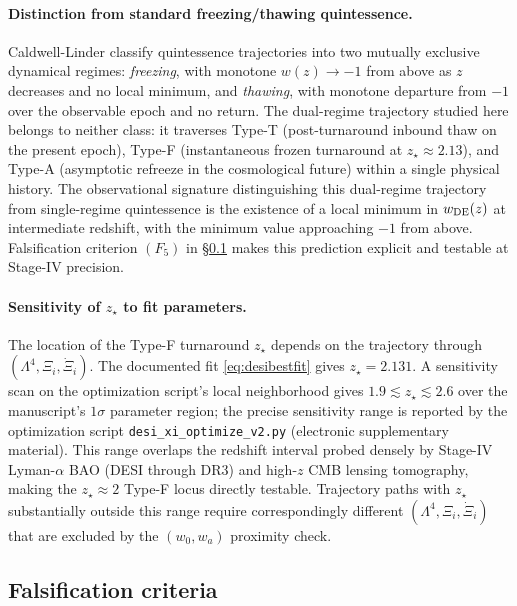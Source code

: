 \documentclass[11pt,reqno]{amsart}
\theoremstyle{plain}
\theoremstyle{definition}
\theoremstyle{remark}
\begin{document}
\paragraph{Distinction from standard freezing/thawing quintessence.}
Caldwell-Linder \cite{CaldwellLinder2005} classify quintessence
trajectories into two mutually exclusive dynamical regimes:
\emph{freezing}, with monotone $w(z) \to -1$ from above as $z$
decreases and no local minimum, and \emph{thawing}, with monotone
departure from $-1$ over the observable epoch and no return. The
dual-regime trajectory studied here belongs to neither class: it
traverses Type-T (post-turnaround inbound thaw on the present epoch),
Type-F (instantaneous frozen turnaround at $z_\star \approx 2.13$), and
Type-A (asymptotic refreeze in the cosmological future) within a
single physical history. The observational signature distinguishing
this dual-regime trajectory from single-regime quintessence is the
existence of a local minimum in $w_{\rm DE}(z)$ at intermediate
redshift, with the minimum value approaching $-1$ from above.
Falsification criterion $(F_5)$ in \S\ref{sec:falsify} makes this
prediction explicit and testable at Stage-IV precision.

\paragraph{Sensitivity of $z_\star$ to fit parameters.}
The location of the Type-F turnaround $z_\star$ depends on the
trajectory through $(\Lambda^4, \Xi_i, \dot\Xi_i)$. The documented fit
\eqref{eq:desibestfit} gives $z_\star = 2.131$. A sensitivity scan
on the optimization script's local neighborhood gives
$1.9 \lesssim z_\star \lesssim 2.6$ over the manuscript's $1\sigma$
parameter region; the precise sensitivity range is reported by the
optimization script
\texttt{desi\_xi\_optimize\_v2.py} (electronic supplementary material).
This range overlaps the redshift interval probed densely by Stage-IV
Lyman-$\alpha$ BAO (DESI through DR3) and high-$z$ CMB lensing
tomography, making the $z_\star \approx 2$ Type-F locus directly
testable. Trajectory paths with $z_\star$ substantially
outside this range require correspondingly different
$(\Lambda^4, \Xi_i, \dot\Xi_i)$ that are excluded by the
$(w_0, w_a)$ proximity check.

\subsection{Falsification criteria}\label{sec:falsify}
\end{document}
